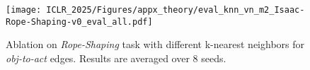 \begin{wrapfigure}[15]{r}{0.3\textwidth}
  \vspace{-0.325in}
  \begin{center}
    \makebox[0.3\textwidth][c]{    
    }
    \texttt{[image: ICLR\_2025/Figures/appx\_theory/eval\_knn\_vn\_m2\_Isaac-Rope-Shaping-v0\_eval\_all.pdf]}
  \end{center}
  \vspace{-0.2in}
    \caption{Ablation on \textit{Rope-Shaping} task with different k-nearest neighbors for \textit{obj-to-act} edges. Results are averaged over 8 seeds.}
    \label{fig:eval_knn_vn}
\end{wrapfigure}

